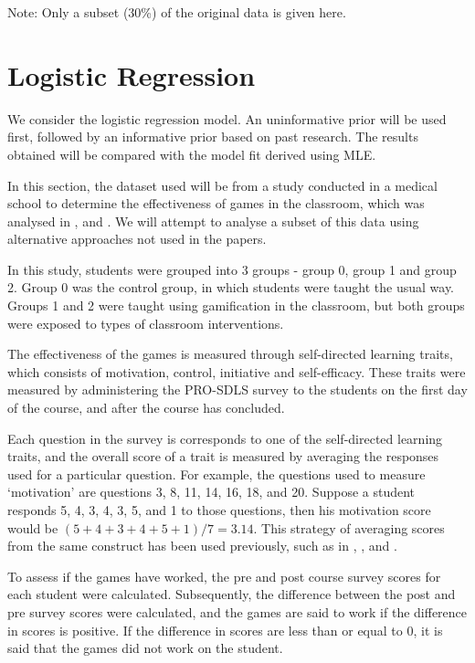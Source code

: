 \documentclass[12pt,a4paper]{article}
\numberwithin{theorem}{section}
\begin{document}
Note: Only a subset (30\%) of the original data is
given here. 

\section{Logistic Regression} \label{ch_expt_lr_sect}



We consider the logistic regression model. An
uninformative prior will be used first, followed
by an informative prior based on past research. The results
obtained will be compared with the model fit derived using 
MLE. 

In this section, the dataset used will be from a 
study conducted in a medical school to determine the
effectiveness of games in the classroom, which 
was analysed in \cite{ang2018gamifying}, and 
\cite{ang2020gamifying}. We will attempt to analyse a
subset of this data using alternative approaches 
not used in the 
papers. 


In this study, students
were grouped into 3 groups - group 0, group 1 and group 2. 
Group 0 was the control group, in which students were
taught the usual way. Groups 1 and 2 were taught using
gamification in the classroom, but both groups were exposed
to types of classroom interventions. 

The effectiveness of the games is measured through
self-directed learning traits, which consists of
motivation, control, initiative and self-efficacy. These
traits were measured by administering
the PRO-SDLS survey \citep{stockdale2011development} to
the students on the first day of the course, and after the
course has concluded. 

Each question in the survey is
corresponds to one of the self-directed learning traits, 
and the overall score of a trait is measured by averaging
the responses used for a particular question. For example,
the questions used to measure `motivation' are questions
3, 8, 11, 14, 16, 18, and 20. Suppose a student responds
5, 4, 3, 4, 3, 5, and 1 to those questions, then his
motivation score would be $(5+4+3+4+5+1)/7 = 3.14$. This
strategy of averaging scores from the same construct has
been used previously, such as in \cite{cazan2014self}, 
\cite{hall2011self}, and \cite{schulze2017massive}. 

To assess if the games have worked, the pre and post course
survey scores for each student were calculated. Subsequently,
the difference between the post and pre survey scores were
calculated, and the games are said to work if the difference
in scores is positive. If the difference in 
scores are less than or equal
to 0, it is said that the games did not work on the student.
\end{document}
